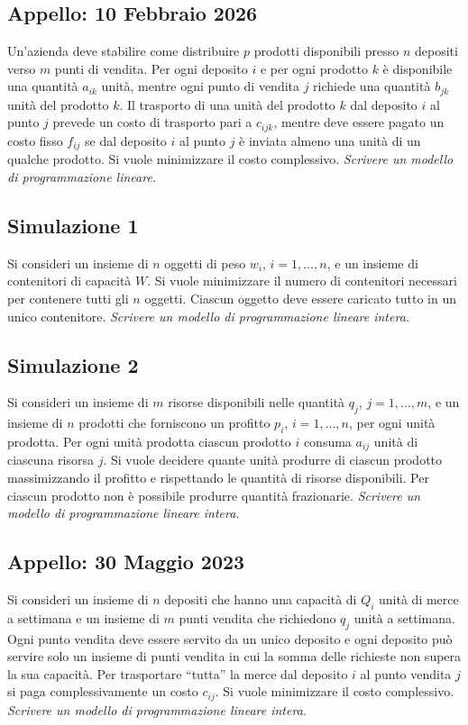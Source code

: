 \documentclass[11pt, a4paper]{article}
\begin{document}
\subsection{Appello: 10 Febbraio 2026}
Un’azienda deve stabilire come distribuire $p$ prodotti disponibili presso $n$ depositi verso $m$ punti di vendita. Per ogni deposito $i$ e per ogni prodotto $k$ è disponibile una quantità $a_{ik}$ unità, mentre ogni punto di vendita $j$ richiede una quantità $b_{jk}$ unità del prodotto $k$. Il trasporto di una unità del prodotto $k$ dal deposito $i$ al punto $j$ prevede un costo di trasporto pari a $c_{ijk}$, mentre deve essere pagato un costo fisso $f_{ij}$ se dal deposito $i$ al punto $j$ è inviata almeno una unità di un qualche prodotto. Si vuole minimizzare il costo complessivo.
\textit{Scrivere un modello di programmazione lineare.}

\subsection{Simulazione 1}
Si consideri un insieme di $n$ oggetti di peso $w_i$, $i = 1, \dots, n$, e un insieme di contenitori di capacità $W$. Si vuole minimizzare il numero di contenitori necessari per contenere tutti gli $n$ oggetti. Ciascun oggetto deve essere caricato tutto in un unico contenitore.
\textit{Scrivere un modello di programmazione lineare intera.}

\subsection{Simulazione 2}
Si consideri un insieme di $m$ risorse disponibili nelle quantità $q_j$, $j = 1, \dots, m$, e un insieme di $n$ prodotti che forniscono un profitto $p_i$, $i = 1, \dots, n$, per ogni unità prodotta. Per ogni unità prodotta ciascun prodotto $i$ consuma $a_{ij}$ unità di ciascuna risorsa $j$. Si vuole decidere quante unità produrre di ciascun prodotto massimizzando il profitto e rispettando le quantità di risorse disponibili. Per ciascun prodotto non è possibile produrre quantità frazionarie.
\textit{Scrivere un modello di programmazione lineare intera.}

\subsection{Appello: 30 Maggio 2023}
Si consideri un insieme di $n$ depositi che hanno una capacità di $Q_i$ unità di merce a settimana e un insieme di $m$ punti vendita che richiedono $q_j$ unità a settimana. Ogni punto vendita deve essere servito da un unico deposito e ogni deposito può servire solo un insieme di punti vendita in cui la somma delle richieste non supera la sua capacità. Per trasportare “tutta” la merce dal deposito $i$ al punto vendita $j$ si paga complessivamente un costo $c_{ij}$. Si vuole minimizzare il costo complessivo.
\textit{Scrivere un modello di programmazione lineare intera.}
\end{document}
